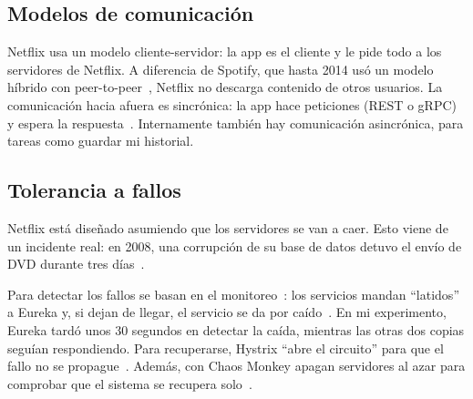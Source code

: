 \subsection{Modelos de comunicación}

Netflix usa un modelo cliente-servidor: la app es el cliente y le pide todo a los servidores de Netflix. A diferencia de Spotify, que hasta 2014 usó un modelo híbrido con peer-to-peer~\cite{TechCrunch_Spotify2014}, Netflix no descarga contenido de otros usuarios. La comunicación hacia afuera es sincrónica: la app hace peticiones (REST o gRPC) y espera la respuesta~\cite{Rangarajan_PlayAPI}. Internamente también hay comunicación asincrónica, para tareas como guardar mi historial.

\subsection{Tolerancia a fallos}

Netflix está diseñado asumiendo que los servidores se van a caer. Esto viene de un incidente real: en 2008, una corrupción de su base de datos detuvo el envío de DVD durante tres días~\cite{Netflix_CloudMigration}.

Para detectar los fallos se basan en el monitoreo~\cite{Giamattei_2024}: los servicios mandan \enquote{latidos} a Eureka y, si dejan de llegar, el servicio se da por caído~\cite{SpringCloudNetflix}. En mi experimento, Eureka tardó unos 30 segundos en detectar la caída, mientras las otras dos copias seguían respondiendo. Para recuperarse, Hystrix \enquote{abre el circuito} para que el fallo no se propague~\cite{SpringCloudNetflix}. Además, con Chaos Monkey apagan servidores al azar para comprobar que el sistema se recupera solo~\cite{Owotogbe_2024}.
